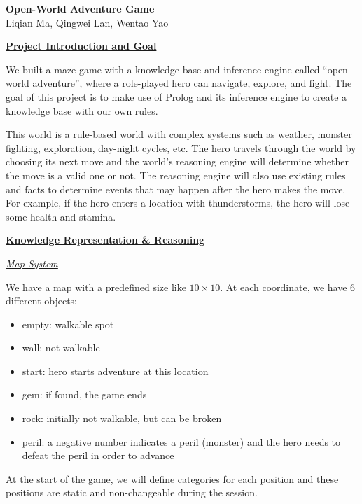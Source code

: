 \documentclass[8pt]{extarticle}
\begin{document}
\begin{center}
\textbf{\Large Open-World Adventure Game}\\[.2cm]
Liqian Ma, Qingwei Lan, Wentao Yao
\end{center}


\begin{multicols*}{2}


\underline{\textbf{\normalsize Project Introduction and Goal}}

We built a maze game with a knowledge base and inference engine called “open-world adventure”, where a role-played hero can navigate, explore, and fight. The goal of this project is to make use of Prolog and its inference engine to create a knowledge base with our own rules.

This world is a rule-based world with complex systems such as weather, monster fighting, exploration, day-night cycles, etc. The hero travels through the world by choosing its next move and the world's reasoning engine will determine whether the move is a valid one or not. The reasoning engine will also use existing rules and facts to determine events that may happen after the hero makes the move. For example, if the hero enters a location with thunderstorms, the hero will lose some health and stamina.



\underline{\textbf{\normalsize Knowledge Representation \& Reasoning}}

\textit{\underline{Map System}}

We have a map with a predefined size like $10 \times 10$. At each coordinate, we have 6 different objects:

\begin{itemize}
\item empty: walkable spot
\item wall:  not walkable
\item start:  hero starts adventure at this location
\item gem: if found, the game ends
\item rock: initially not walkable, but can be broken
\item peril: a negative number indicates a peril (monster) and the hero needs to defeat the peril in order to advance
\end{itemize}

At the start of the game, we will define categories for each position and these positions are static and non-changeable during the session.



\end{multicols*}
\end{document}
